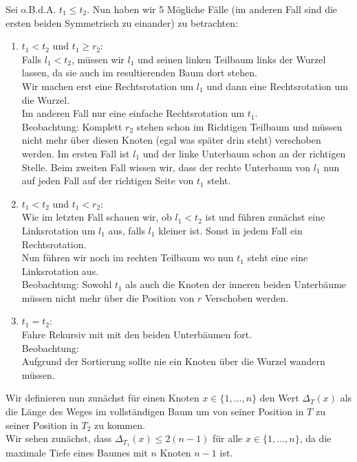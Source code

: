 \documentclass[11pt,a4paper,ngerman]{article}
\begin{document}
Sei o.B.d.A. $t_1 \leq t_2$. Nun haben wir 5 Mögliche Fälle (im anderen Fall
sind die ersten beiden Symmetrisch zu einander) zu betrachten:
\begin{enumerate}[1.]
   \item $t_1 < t_2$ und $t_1 \geq r_2$:\\
      Falls $l_1 < t_2$, müssen wir $l_1$ und seinen linken Teilbaum
      links der Wurzel lassen, da sie auch im resultierenden Baum dort stehen.\\
      Wir machen erst eine Rechtsrotation um $l_1$ und dann eine Rechtsrotation
      um die Wurzel.\\
      Im anderen Fall nur eine einfache Rechtsrotation um $t_1$.\\
      Beobachtung: Komplett $r_2$ stehen schon im Richtigen Teilbaum und müssen
      nicht mehr über diesen Knoten (egal was später drin steht) verschoben werden.
      Im ersten Fall ist $l_1$ und der linke Unterbaum schon an der richtigen 
      Stelle. Beim zweiten Fall wissen wir, dass der rechte Unterbaum von $l_1$
      nun auf jeden Fall auf der richtigen Seite von $t_1$ steht.
   \item $t_1 < t_2$ und $t_1 < r_2$:\\
      Wie im letzten Fall schauen wir, ob $l_1 < t_2$ ist und führen zunächst
      eine Linksrotation um $l_1$ aus, falls $l_1$ kleiner ist. Sonst in jedem Fall ein      Rechtsrotation.\\
      Nun führen wir noch im rechten Teilbaum wo nun $t_1$ steht 
      eine eine Linksrotation aus.\\
      Beobachtung: Sowohl $t_1$ als auch die Knoten der inneren beiden Unterbäume 
      müssen nicht mehr über die Position von $r$ Verschoben werden.
   \item $t_1 = t_2$:\\
      Fahre Rekursiv mit mit den beiden Unterbäumen fort.\\
      Beobachtung:\\
      Aufgrund der Sortierung sollte nie ein Knoten über die Wurzel wandern müssen.
\end{enumerate}

Wir definieren nun zunächst für einen Knoten $x \in \{1, \ldots, n \}$ den Wert 
$\Delta_T(x)$ als die Länge des Weges im vollständigen Baum um von seiner Position
in $T$ zu seiner Position in $T_2$ zu kommen.\\


Wir sehen zunächst, dass $\Delta_{T_1}(x) \leq 2(n-1)$ für alle $x \in \{1, \ldots, n \}$, da die maximale Tiefe eines Baumes mit $n$ Knoten $n-1$ ist.\\
\end{document}
